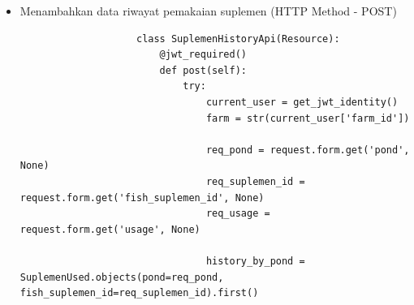 \begin{spacing}{1.5}
\begin{enumerate}
\begin{enumerate}
\begin{itemize}
\begin{lstlisting}
								pipeline = [
									{
										'$match': {
											'created_at': {
												'$gte': start_date,
												'$lte': end_date,
											}
										}
									},
									{
										'$match': {
											"farm_id": farm_id,
											'pond': {
												'$regex': pond_name,
												'$options': 'i'
											}
										}
									},
									{"$sort": {"fish_suplemen_id": 1}},
									{'$lookup': {
										'from': 'suplemen_inventory',
										'let': {"fishsuplemenid": "$fish_suplemen_id"},
										'pipeline': [
											{'$match': {'$expr': {'$eq': ['$_id', '$$fishsuplemenid']}}},
											{
												'$match': {
													'name': {
														'$regex': name,
														'$options': 'i'
													}
												}
											},
											{"$project": {
												"_id": 1,
												"id_int": 1,
												"function": 1,
												"name": 1,
												"description": 1,
												"price": 1,
												"amount": 1,
												"type": 1,
												"min_expired_period": 1,
												"max_expired_period": 1,
												"image": 1,
												"created_at": 1,
											}}
										],
										'as': 'suplemen'
									}},
									{"$addFields": {
										"suplemen": {"$first": "$suplemen"},
									}},
								]

								testing = SuplemenUsed.objects.aggregate(pipeline)
								temp = list(testing)
								response = json.dumps({
									'status': 'success',
									'data': temp,
								}, default=str)
								return Response(response, mimetype="application/json", status=200)
							except Exception as e:
								response = {"message": e}
								response = json.dumps(response, default=str)
								return Response(response, mimetype="application/json", status=400)
				\end{lstlisting}

				\item Menambahkan data riwayat pemakaian suplemen (HTTP Method - POST)
				
				\begin{lstlisting}
					class SuplemenHistoryApi(Resource):
						@jwt_required()
						def post(self):
							try:
								current_user = get_jwt_identity()
								farm = str(current_user['farm_id'])
					
								req_pond = request.form.get('pond', None)
								req_suplemen_id = request.form.get('fish_suplemen_id', None)
								req_usage = request.form.get('usage', None) 
								
								history_by_pond =  SuplemenUsed.objects(pond=req_pond, fish_suplemen_id=req_suplemen_id).first()
					

\end{lstlisting}
\end{itemize}
\end{enumerate}
\end{enumerate}
\end{spacing}
